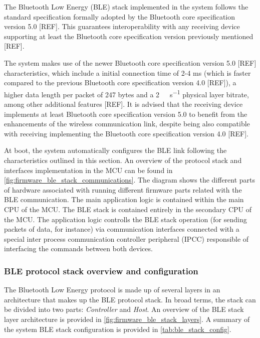 
The Bluetooth Low Energy (BLE) stack implemented in the system follows the standard specification formally adopted by the Bluetooth core specification version 5.0 [REF]. This guarantees interoperability with any receiving device supporting at least the Bluetooth core specification version previously mentioned [REF].

The system makes use of the newer Bluetooth core specification version 5.0 [REF] characteristics, which include a initial connection time of 2-4 ms (which is faster compared to the previous Bluetooth core specification version 4.0 [REF]), a higher data length per packet of 247 bytes and a \SI{2}{\mega\bit\per\second} physical layer bitrate, among other additional features [REF]. It is advised that the receiving device implements at least Bluetooth core specification version 5.0 to benefit from the enhancements of the wireless communication link, despite being also compatible with receiving implementing the Bluetooth core specification version 4.0 [REF].

At boot, the system automatically configures the BLE link following the characteristics outlined in this section. An overview of the protocol stack and interfaces implementation in the MCU can be found in \cref{fig:firmware_ble_stack_communications}. The diagram shows the different parts of hardware associated with running different firmware parts related with the BLE communication. The main application logic is contained within the main CPU of the MCU. The BLE stack is contained entirely in the secondary CPU of the MCU. The application logic controlls the BLE stack operation (for sending packets of data, for instance) via communication interfaces connected with a special inter process communication controller peripheral (IPCC) responsible of interfacing the commands between both devices. %

\subsubsection{BLE protocol stack overview and configuration} \label{sec:ble_stack}

The Bluetooth Low Energy protocol is made up of several layers in an architecture that makes up the BLE protocol stack. In broad terms, the stack can be divided into two parts: \textit{Controller} and \textit{Host}. An overview of the BLE stack layer architecture is provided in \cref{fig:firmware_ble_stack_layers}. A summary of the system BLE stack configuration is provided in \cref{tab:ble_stack_config}.

